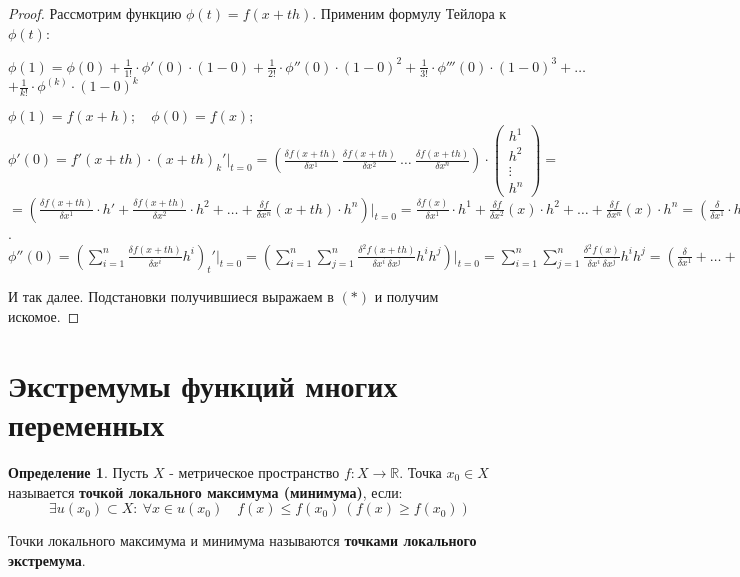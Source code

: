 \documentclass{report}
\theoremstyle{definition}
\newtheorem{definition}{Определение}[section]
\begin{document}
\begin{proof}
  Рассмотрим функцию $\phi(t) = f(x + th)$. Применим формулу Тейлора к $\phi(t)$:
  \begin{center}
    $\phi(1) = \phi(0) + \frac{1}{1!} \cdot \phi'(0) \cdot (1-0) + \frac{1}{2!} \cdot \phi''(0) \cdot (1-0)^2 + \frac{1}{3!} \cdot \phi'''(0) \cdot (1-0)^3 + \ldots$ \\
    $ + \frac{1}{k!} \cdot \phi^{(k)} \cdot (1-0)^k$ \\
  \end{center}
  $\phi(1) = f(x + h); \quad \phi(0) = f(x);$ \\

  $\phi'(0) = f'(x + th) \cdot (x + th)_k'\big|_{t = 0} = \left(\frac{\delta f(x + th)}{\delta x^1} \ \frac{\delta f(x + th)}{\delta x^2} \ \ldots \ \frac{\delta f(x + th)}{\delta x^n}\right) \cdot \left(\begin{array}{c}
        h^1    \\
        h^2    \\
        \vdots \\
        h^n
      \end{array}\right) =$ \\
  $= (\frac{\delta f(x + th)}{\delta x^1} \cdot h' + \frac{\delta f(x+th)}{\delta x^2} \cdot h^2 + \ldots + \frac{\delta f}{\delta x^n}(x + th)\cdot h^n) \big|_{t=0} = \frac{\delta f(x)}{\delta x^1}\cdot h^1 + \frac{\delta f}{\delta x^2}(x)\cdot h^2 + \ldots + \frac{\delta f}{\delta x^n}(x) \cdot h^n = (\frac{\delta}{\delta x^1} \cdot h^1 + \ldots + \frac{\delta}{\delta x^n}\cdot h^n)f(x)$. \\

  $\phi''(0) = (\sum_{i = 1}^{n} \frac{\delta f(x + th)}{\delta x^i}h^i)_t' \big|_{t = 0} = (\sum_{i = 1}^{n} \sum_{j = 1}^{n} \frac{\delta^2 f(x + th)}{\delta x^i \ \delta x^j} h^i h^j) \big|_{t = 0} = \sum_{i = 1}^{n}\sum_{j = 1}^{n}\frac{\delta^2 f(x)}{\delta x^i \ \delta x^j} h^i h^j = (\frac{\delta}{\delta x^1} + \ldots + \frac{\delta}{\delta x^n}h^n)^2 f(x)$

  И так далее. Подстановки получившиеся выражаем в $(*)$ и получим искомое.
\end{proof}

\section{Экстремумы функций многих переменных}

\begin{definition}
  Пусть $X$ - метрическое пространство $f:X \rightarrow \mathbb{R}$. Точка $x_0 \in X$ называется \textbf{точкой локального максимума (минимума)}, если:
  \begin{equation*}
    \exists u(x_0)\subset X: \ \forall x \in u(x_0) \quad f(x)\leqslant f(x_0) \ (f(x)\geqslant f(x_0))
  \end{equation*}

  Точки локального максимума и минимума называются \textbf{точками локального экстремума}.
\end{definition}
\end{document}
